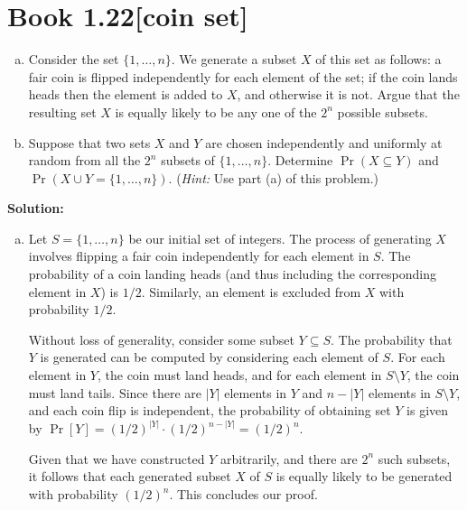 \documentclass[11pt]{article}
\newcommand\size[1]{\left|#1\right|} %
\newenvironment{question}[2]
{\newpage\section{#1\texorpdfstring{\hfill}{horizontal spacing}{\rm\normalsize #2}}}{}
\newenvironment{solution}
{\textbf{Solution: }\color{blue}}
{\color{black}}
\begin{document}

\begin{question}{Book 1.22}{[coin set]}

\begin{enumerate}[(a)]
    \item Consider the set \(\{1, \ldots, n\}\). We generate a subset \(X\) of this set as follows: a fair coin is flipped independently for each element of the set; if the coin lands heads then the element is added to \(X\), and otherwise it is not. Argue that the resulting set \(X\) is equally likely to be any one of the \(2^n\) possible subsets.
    
    \item Suppose that two sets \(X\) and \(Y\) are chosen independently and uniformly at random from all the \(2^n\) subsets of \(\{1, \ldots, n\}\). Determine \(\Pr(X\subseteq Y)\) and \(\Pr(X \cup Y = \{1,\ldots,n\})\). (\emph{Hint:} Use part (a) of this problem.)
\end{enumerate}

\begin{solution}

\begin{enumerate}[(a)]
    \item Let \(S=\{1,\ldots,n\}\) be our initial set of integers. The process of generating \(X\) involves flipping a fair coin independently for each element in \(S\). The probability of a coin landing heads (and thus including the corresponding element in \(X\)) is \(1/2\). Similarly, an element is excluded from \(X\) with probability \(1/2\).

    Without loss of generality, consider some subset \(Y \subseteq S\). The probability that \(Y\) is generated can be computed by considering each element of \(S\). For each element in \(Y\), the coin must land heads, and for each element in \(S \setminus Y\), the coin must land tails. Since there are \(\size{Y}\) elements in \(Y\) and \(n-\size{Y}\) elements in \(S \setminus Y\), and each coin flip is independent, the probability of obtaining set \(Y\) is given by \(\Pr[Y] = (1/2)^{\size{Y}} \cdot (1/2)^{n-\size{Y}} = (1/2)^n\).

    Given that we have constructed \(Y\) arbitrarily, and there are \(2^n\) such subsets, it follows that each generated subset \(X\) of \(S\) is equally likely to be generated with probability \((1/2)^n\). This concludes our proof.


\end{enumerate}
\end{solution}
\end{question}
\end{document}
